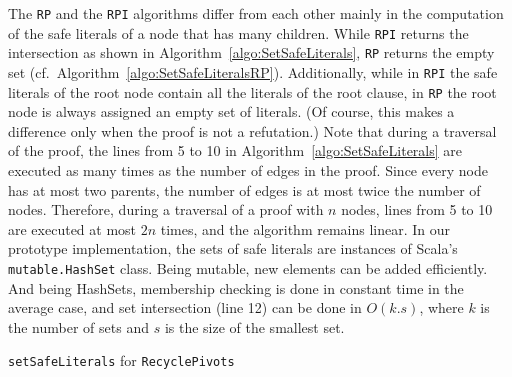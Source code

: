 \documentclass[envcountsame]{llncs}
\newcommand{\RPlong}{\texttt{Recycle\-Pivots}}
\newcommand{\RP}{\texttt{\upshape RP}}
\newcommand{\RPI}{\texttt{\upshape RPI}}
\begin{document}
The {\RP} and the {\RPI} algorithms differ from each other mainly in the
computation of the safe literals of a node that has many children. While {\RPI}
returns the intersection as shown in Algorithm~\ref{algo:SetSafeLiterals}, {\RP}
returns the empty set (cf.\ Algorithm~\ref{algo:SetSafeLiteralsRP}). Additionally, while in {\RPI} the safe literals of the root node contain all the literals of the root clause, in {\RP} the root node is always assigned an empty set of literals. 
(Of course, this makes a difference only when the proof is not a refutation.)
Note that during a traversal of the proof, 
the lines from 5 to 10 in Algorithm~\ref{algo:SetSafeLiterals} are executed as many times as the number of edges in the proof. 
Since every node has at most two parents, the number of edges is at most twice the number of nodes. 
Therefore, during a traversal of a proof with $n$ nodes, lines from 5 to 10 are
executed at most $2n$ times, and the algorithm remains linear.
In our prototype implementation, the sets of safe literals are instances of Scala's 
\texttt{mutable.HashSet} class. Being mutable, new elements can be added efficiently.
And being HashSets, membership checking is done in constant time in the average case, 
and set intersection (line 12) can be done in $O(k.s)$, where $k$ is the number of sets and $s$ is the size of the smallest set.


\linesnumbered
\begin{algorithm}[t]
\begin{footnotesize}
\SetLine
{}


\BlankLine

\caption{\label{algo:SetSafeLiteralsRP} \texttt{setSafeLiterals} for \RPlong}
\end{footnotesize}
\end{algorithm}
\end{document}
